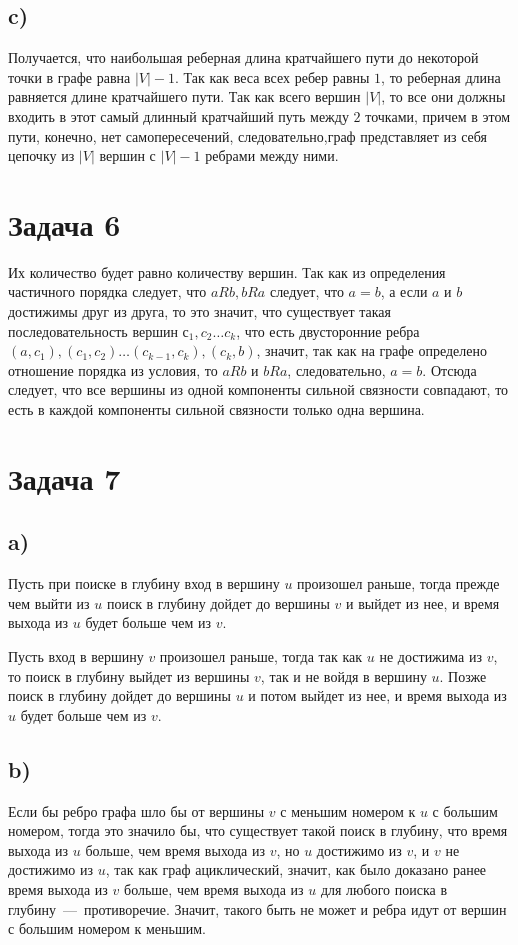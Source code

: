 \documentclass[a4paper,12pt]{article} %
\begin{document}
\subsection{c)}
\hspace{5mm}
Получается, что наибольшая реберная длина кратчайшего пути до некоторой точки в графе равна $|V|-1$. Так как веса всех ребер равны $1$, то реберная длина равняется длине кратчайшего пути. Так как всего вершин $|V|$, то все они должны входить в этот самый длинный кратчайший путь между $2$ точками, причем в этом пути, конечно, нет самопересечений, следовательно,граф представляет из себя цепочку из $|V|$ вершин с $|V|-1$ ребрами между ними.

\section{Задача 6}
\hspace{5mm}
Их количество будет равно количеству вершин. Так как из определения частичного порядка следует, что $aRb, bRa$ следует, что  $a=b$, а если $a$ и $b$ достижимы друг из друга, то это значит, что существует такая последовательность вершин $с_1,c_2\ldots c_k$, что есть двусторонние ребра $(a,c_1),(c_1,c_2)\ldots (c_{k-1},c_k),(c_k,b)$, значит, так как на графе определено отношение порядка из условия, то $aRb$ и $bRa$, следовательно, $a=b$. Отсюда следует, что все вершины из одной компоненты сильной связности совпадают, то есть в каждой компоненты сильной связности только одна вершина.

\section{Задача 7}
\subsection{a)}
\hspace{5mm}
Пусть при поиске в глубину вход в вершину $u$ произошел раньше, тогда прежде чем выйти из $u$ поиск в глубину дойдет до вершины $v$ и выйдет из нее, и время выхода из $u$ будет больше чем из $v$. 

Пусть вход в вершину $v$ произошел раньше, тогда так как $u$ не достижима из $v$, то поиск в глубину выйдет из вершины $v$, так и не войдя в вершину $u$. Позже поиск в глубину дойдет до вершины $u$ и потом выйдет из нее, и время выхода из $u$ будет больше чем из $v$.

\subsection{b)}
\hspace{5mm}
Если бы ребро графа шло бы от вершины $v$ с меньшим номером к $u$ с большим номером, тогда это значило бы, что существует такой поиск в глубину, что время выхода из $u$ больше, чем время выхода из $v$, но $u$ достижимо из $v$, и $v$ не достижимо из $u$, так как граф ациклический, значит, как было доказано ранее время выхода из $v$ больше, чем время выхода из $u$ для любого поиска в глубину~---~противоречие. Значит, такого быть не может и ребра идут от вершин с большим номером к меньшим.
\end{document}
